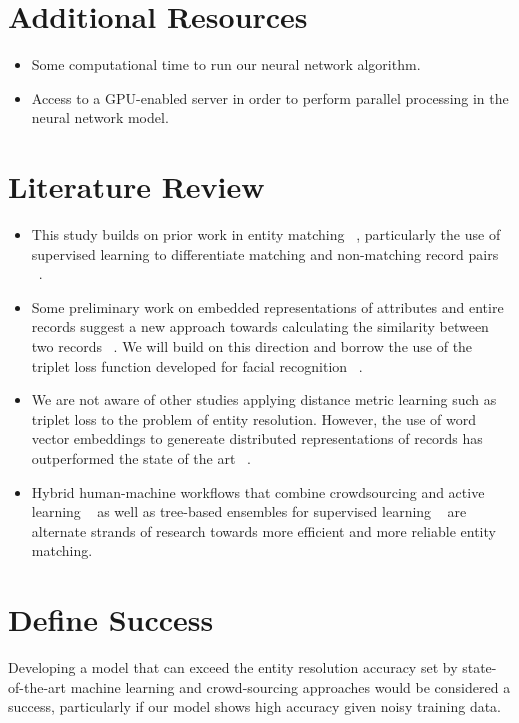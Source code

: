 \documentclass{proc}
\begin{document}
\section{Additional Resources}

\begin{itemize}
  \item Some computational time to run our neural network algorithm.
  \item Access to a GPU-enabled server in order to perform parallel processing in the neural network model. 
\end{itemize}
 
\section{Literature Review}

\begin{itemize}
\item This study builds on prior work in entity matching ~\cite{elmagarmid2007duplicate}, particularly the use of supervised learning to differentiate matching and non-matching record pairs ~\cite{kopcke2010evaluation}.

\item Some preliminary work on embedded representations of attributes and entire records suggest a new approach towards calculating the similarity between two records ~\cite{ebraheem2017deeper}. We will build on this direction and borrow the use of the triplet loss function developed for facial recognition ~\cite{schroff2015facenet}.

\item We are not aware of other studies applying distance metric learning such as triplet loss to the problem of entity resolution. However, the use of word vector embeddings to genereate distributed representations of records has outperformed the state of the art ~\cite{ebraheem2017deeper}.

\item Hybrid human-machine workflows that combine crowdsourcing and active learning ~\cite{wang2012crowder,gokhale2014corleone} as well as tree-based ensembles for supervised learning ~\cite{varma2017relic} are alternate strands of research towards more efficient and more reliable entity matching.

\end{itemize}


\section{Define Success}

Developing a model that can exceed the entity resolution accuracy set by state-of-the-art machine learning and crowd-sourcing approaches would be considered a success, particularly if our model shows high accuracy given noisy training data.



\end{document}
